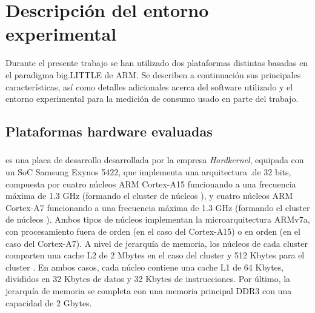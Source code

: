 \section{Descripción del entorno experimental}

Durante el presente trabajo se han utilizado dos plataformas distintas basadas en el paradigma big.LITTLE de ARM.
Se describen a continuación sus principales características, así como detalles adicionales acerca del software 
utilizado y el entorno experimental para la medición de consumo usado en parte del trabajo.

\subsection{Plataformas hardware evaluadas}

\subsubsection{\odroid}

\odroidxu es una placa de desarrollo desarrollada por la empresa {\em
  Hardkernel}, equipada con un SoC Samsung Exynos 5422, que implementa una
arquitectura \big.\LITTLE de 32 bits, compuesta por cuatro núcleos ARM
Cortex-A15 funcionando a una frecuencia máxima de 1.3 GHz (formando el
cluster de núcleos \BIG), y cuatro núcleos ARM Cortex-A7 funcionando a una
frecuencia máxima de 1.3 GHz (formando el cluster de núcleos \LITTLE). Ambos
tipos de núcleos implementan la microarquitectura ARMv7a, con procesamiento
fuera de orden (en el caso del Cortex-A15) o en orden (en el caso del
Cortex-A7). A nivel de jerarquía de memoria, los núcleos de cada cluster
comparten una cache L2 de 2 Mbytes en el caso del cluster \BIG y 512 Kbytes
para el cluster \LITTLE. En ambos casos, cada núcleo contiene una cache L1
de 64 Kbytes, divididos en 32 Kbytes de datos y 32 Kbytes de
instrucciones. Por último, la jerarquía de memoria se completa con una
memoria principal DDR3 con una capacidad de 2 Gbytes.

\subsubsection{\juno}

